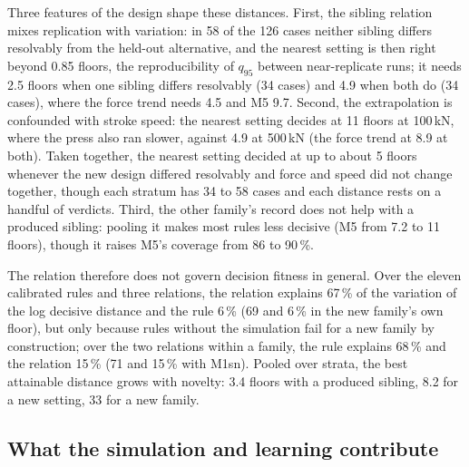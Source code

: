 \documentclass[pdflatex,sn-basic,lineno]{sn-jnl}
\begin{document}
Three features of the design shape these distances. First, the sibling relation mixes replication with variation: in 58 of the 126 cases neither sibling differs resolvably from the held-out alternative, and the nearest setting is then right beyond 0.85 floors, the reproducibility of $q_{95}$ between near-replicate runs; it needs 2.5 floors when one sibling differs resolvably (34 cases) and 4.9 when both do (34 cases), where the force trend needs 4.5 and M5 9.7. Second, the extrapolation is confounded with stroke speed: the nearest setting decides at 11 floors at 100\,kN, where the press also ran slower, against 4.9 at 500\,kN (the force trend at 8.9 at both). Taken together, the nearest setting decided at up to about 5 floors whenever the new design differed resolvably and force and speed did not change together, though each stratum has 34 to 58 cases and each distance rests on a handful of verdicts. Third, the other family's record does not help with a produced sibling: pooling it makes most rules less decisive (M5 from 7.2 to 11 floors), though it raises M5's coverage from 86 to 90\,\%.

The relation therefore does not govern decision fitness in general. Over the eleven calibrated rules and three relations, the relation explains 67\,\% of the variation of the log decisive distance and the rule 6\,\% (69 and 6\,\% in the new family's own floor), but only because rules without the simulation fail for a new family by construction; over the two relations within a family, the rule explains 68\,\% and the relation 15\,\% (71 and 15\,\% with M1sn). Pooled over strata, the best attainable distance grows with novelty: 3.4 floors with a produced sibling, 8.2 for a new setting, 33 for a new family.

\subsection{What the simulation and learning contribute}\label{sec:res-ml}
\end{document}
